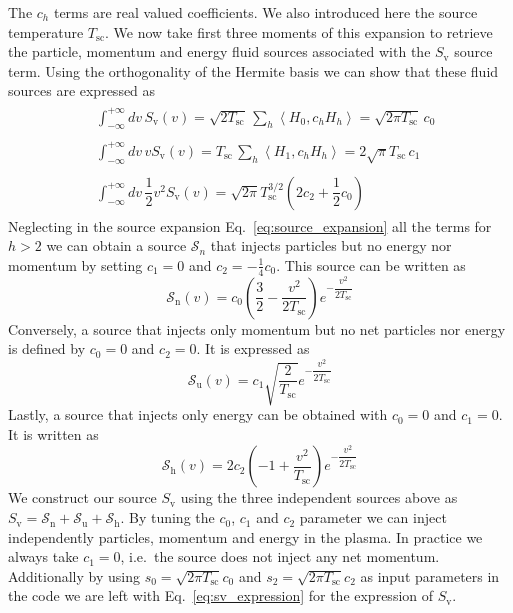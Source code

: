 \documentclass[11pt]{article}
\begin{document}
%
The $c_h$ terms are real valued coefficients. We also introduced here the source temperature $T_\mathrm{sc}$. We now take first three moments of this expansion to retrieve the particle, momentum and energy fluid sources associated with the $S_\mathrm{v}$ source term. Using the orthogonality of the Hermite basis we can show that these fluid sources are expressed as 
%
\begin{align*}
    &
    \begin{aligned}
        \int_{-\infty}^{+\infty} dv\, S_\mathrm{v}(v) = \sqrt{2 T_\mathrm{sc}} \, \sum\limits_{h}^{} \left<H_0, c_h H_h \right> = \sqrt{2 \pi  T_\mathrm{sc}} \, c_0
    \end{aligned} \\
    &
    \begin{aligned}
    \int_{-\infty}^{+\infty} dv\, v S_\mathrm{v}(v) = T_\mathrm{sc} \, \sum\limits_{h}^{} \left<H_1, c_h H_h \right> = 2\sqrt{\pi} T_\mathrm{sc} \, c_1
    \end{aligned} \\
    &
    \begin{aligned}
    \int_{-\infty}^{+\infty} dv\, \dfrac{1}{2} v^2 S_\mathrm{v}(v) =  \sqrt{2\pi } T_\mathrm{sc}^{3/2}  \left( 2c_2 + \dfrac{1}{2}c_0 \right)
    \end{aligned}
\end{align*}
%
Neglecting in the source expansion Eq.~\ref{eq:source_expansion} all the terms for $h>2$ we can obtain a source $\mathcal{S}_n$ that injects particles but no energy nor momentum by setting $c_1 = 0$ and $c_2 = -\tfrac{1}{4}c_0$. This source can be written as
%
\begin{equation}\label{eq:source_density_only}
\mathcal{S}_\mathrm{n}(v) = c_0 \left( \dfrac{3}{2} - \dfrac{v^2}{2 T_\mathrm{sc}} \right) e^{- \dfrac{v^2}{2 T_\mathrm{sc}}} 
\end{equation}
%
Conversely, a source that injects only momentum but no net particles nor energy is defined by $c_0 = 0$ and $c_2 = 0$. It is expressed as 
%
\begin{equation}\label{eq:source_momentum_only}
\mathcal{S}_\mathrm{u}(v) = c_1 \sqrt{ \dfrac{2}{T_\mathrm{sc}}}  e^{- \dfrac{v^2}{2 T_\mathrm{sc}}} 
\end{equation}
%
Lastly, a source that injects only energy can be obtained with $c_0 = 0$ and $c_1 = 0$. It is written as 
%
\begin{equation}\label{eq:source_energy_only}
\mathcal{S}_\mathrm{h}(v) = 2c_2 \left( -1 + \dfrac{v^2}{T_\mathrm{sc}} \right)   e^{- \dfrac{v^2}{2 T_\mathrm{sc}}} 
\end{equation}
%
We construct our source $S_\mathrm{v}$ using the three independent sources above as $S_\mathrm{v} = \mathcal{S}_\mathrm{n} + \mathcal{S}_\mathrm{u} + \mathcal{S}_\mathrm{h}$. By tuning the $c_0$, $c_1$ and $c_2$ parameter we can inject independently particles, momentum and energy in the plasma. In practice we always take $c_1=0$, i.e.\ the source does not inject any net momentum. Additionally by using $s_0 = \sqrt{2 \pi T_\mathrm{sc}}c_0 $ and $s_2 = \sqrt{2 \pi T_\mathrm{sc}}c_2 $ as input parameters in the code we are left with Eq.~\ref{eq:sv_expression} for the expression of $S_\mathrm{v}$.
\end{document}
